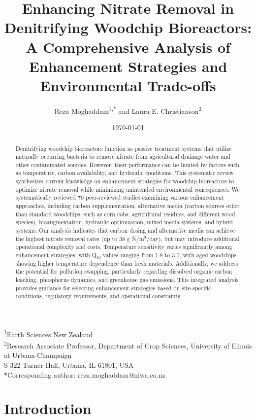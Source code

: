 \documentclass[12pt,a4paper]{article}
\title{Enhancing Nitrate Removal in Denitrifying Woodchip Bioreactors: A Comprehensive Analysis of Enhancement Strategies and Environmental Trade-offs}
\author{Reza Moghaddam\textsuperscript{1,*} and Laura E. Christianson\textsuperscript{2}}
\date{\today}
\begin{document}
\maketitle

\begin{center}
\footnotesize
\textsuperscript{1}Earth Sciences New Zealand\\
\textsuperscript{2}Research Associate Professor, Department of Crop Sciences, University of Illinois at Urbana-Champaign\\
S-322 Turner Hall, Urbana, IL 61801, USA\\
*Corresponding author: reza.moghaddam@niwa.co.nz
\end{center}

\begin{abstract}
Denitrifying woodchip bioreactors function as passive treatment systems that utilize naturally occurring bacteria to remove nitrate from agricultural drainage water and other contaminated sources. However, their performance can be limited by factors such as temperature, carbon availability, and hydraulic conditions. This systematic review synthesizes current knowledge on enhancement strategies for woodchip bioreactors to optimize nitrate removal while minimizing unintended environmental consequences. We systematically reviewed 70 peer-reviewed studies examining various enhancement approaches, including carbon supplementation, alternative media (carbon sources other than standard woodchips, such as corn cobs, agricultural residues, and different wood species), bioaugmentation, hydraulic optimization, mixed media systems, and hybrid systems. Our analysis indicates that carbon dosing and alternative media can achieve the highest nitrate removal rates (up to 38 g N/m$^3$/day), but may introduce additional operational complexity and costs. Temperature sensitivity varies significantly among enhancement strategies, with Q$_{10}$ values ranging from 1.8 to 3.0, with aged woodchips showing higher temperature dependence than fresh materials. Additionally, we address the potential for pollution swapping, particularly regarding dissolved organic carbon leaching, phosphorus dynamics, and greenhouse gas emissions. This integrated analysis provides guidance for selecting enhancement strategies based on site-specific conditions, regulatory requirements, and operational constraints.
\end{abstract}

\section{Introduction}
\end{document}
